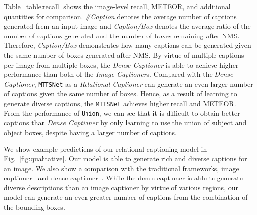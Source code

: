 \documentclass[10pt,twocolumn,letterpaper]{article}
\begin{document}
Table~\ref{table:recall} shows the image-level recall, METEOR, and additional quantities for comparison. 
\emph{\#Caption} denotes the average number of captions generated from an input image and \emph{Caption/Box} denotes the average ratio of the number of captions generated and the number of boxes remaining after NMS.
Therefore, \emph{Caption/Box} demonstrates how many captions can be generated given the same number of boxes generated after NMS.
By virtue of multiple captions per image from multiple boxes, the \emph{Dense Captioner} is able to achieve higher performance than {both of the} \emph{Image Captioner}s. 
Compared with the \emph{Dense Captioner}, \texttt{MTTSNet} as a \emph{Relational Captioner} can generate an even larger number of captions given the same number of boxes.
Hence, as a result of learning to generate diverse captions, the \texttt{MTTSNet} achieves higher recall and METEOR.
From the performance of \texttt{Union}, we can see that it is difficult to obtain better captions than \emph{Dense Captioner} by only learning to use the union of subject and object boxes, despite having a larger number of captions.

We show example predictions of our relational captioning model in Fig.~\ref{fig:qualitative}. 
Our model is able to generate rich and diverse captions for an image. 
We also show a comparison with the traditional frameworks, image captioner~\cite{vinyals2015show} and dense captioner~\cite{johnson2016densecap}.
While the dense captioner is able to generate diverse descriptions than an image captioner by virtue of various regions, our model can generate an even greater number of captions from the combination of the bounding boxes.
\end{document}
